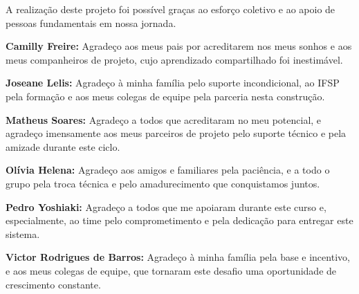 \begin{agradecimentos}
A realização deste projeto foi possível graças ao esforço coletivo e ao apoio de pessoas fundamentais em nossa jornada.

\vspace{0.5cm}
\noindent\textbf{Camilly Freire:} Agradeço aos meus pais por acreditarem nos meus sonhos e aos meus companheiros de projeto, cujo aprendizado compartilhado foi inestimável.

\vspace{0.5cm}
\noindent\textbf{Joseane Lelis:} Agradeço à minha família pelo suporte incondicional, ao IFSP pela formação e aos meus colegas de equipe pela parceria nesta construção.

\vspace{0.5cm}
\noindent\textbf{Matheus Soares:} Agradeço a todos que acreditaram no meu potencial, e agradeço imensamente aos meus parceiros de projeto pelo suporte técnico e pela amizade durante este ciclo.

\vspace{0.5cm}
\noindent\textbf{Olívia Helena:} Agradeço aos amigos e familiares pela paciência, e a todo o grupo pela troca técnica e pelo amadurecimento que conquistamos juntos.

\vspace{0.5cm}
\noindent\textbf{Pedro Yoshiaki:} Agradeço a todos que me apoiaram durante este curso e, especialmente, ao time pelo comprometimento e pela dedicação para entregar este sistema.

\vspace{0.5cm}
\noindent\textbf{Victor Rodrigues de Barros:} Agradeço à minha família pela base e incentivo, e aos meus colegas de equipe, que tornaram este desafio uma oportunidade de crescimento constante.
\end{agradecimentos}

